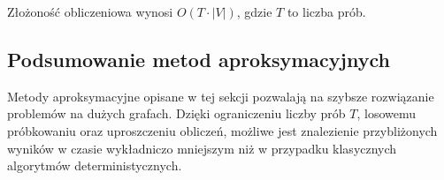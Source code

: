 Złożoność obliczeniowa wynosi \( O(T \cdot |V|) \), gdzie \( T \) to liczba prób.

\subsection{Podsumowanie metod aproksymacyjnych}

Metody aproksymacyjne opisane w tej sekcji pozwalają na szybsze rozwiązanie problemów na dużych grafach. Dzięki ograniczeniu liczby prób \( T \), losowemu próbkowaniu oraz uproszczeniu obliczeń, możliwe jest znalezienie przybliżonych wyników w czasie wykładniczo mniejszym niż w przypadku klasycznych algorytmów deterministycznych.

